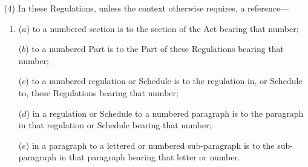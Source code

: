 \documentclass[12pt,a4paper]{article}
\begin{document}
(4) In these Regulations, unless the context otherwise requires, a reference—
\begin{enumerate}\item[]
($a$) to a numbered section is to the section of the Act bearing that number;

($b$) to a numbered Part is to the Part of these Regulations bearing that number;

($c$) to a numbered regulation or Schedule is to the regulation in, or Schedule to, these Regulations bearing that number;

($d$) in a regulation or Schedule to a numbered paragraph is to the paragraph in that regulation or Schedule bearing that number;

($e$) in a paragraph to a lettered or numbered sub-paragraph is to the sub-paragraph in that paragraph bearing that letter or number.
\end{enumerate}
\end{document}
